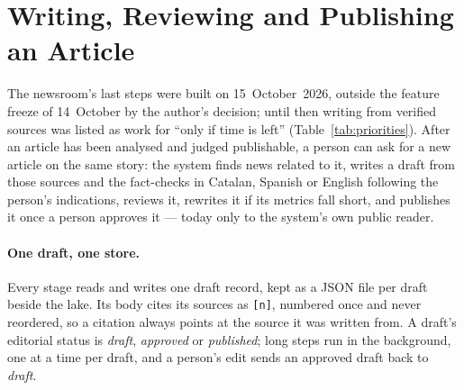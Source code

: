 
\section{Writing, Reviewing and Publishing an Article}
\label{sec:dev-writing}

The newsroom's last steps were built on 15~October~2026, outside the
feature freeze of 14~October by the author's decision; until then
writing from verified sources was listed as work for ``only if time is
left'' (Table~\ref{tab:priorities}). After an article has been analysed
and judged publishable, a person can ask for a new article on the same
story: the system finds news related to it, writes a draft from those
sources and the fact-checks in Catalan, Spanish or English following
the person's indications, reviews it, rewrites it if its metrics fall
short, and publishes it once a person approves it --- today only to the
system's own public reader.

\paragraph{One draft, one store.} Every stage reads and writes one
draft record, kept as a JSON file per draft beside the lake. Its body
cites its sources as \texttt{[n]}, numbered once and never reordered,
so a citation always points at the source it was written from. A
draft's editorial status is \emph{draft}, \emph{approved} or
\emph{published}; long steps run in the background, one at a time per
draft, and a person's edit sends an approved draft back to
\emph{draft}.

